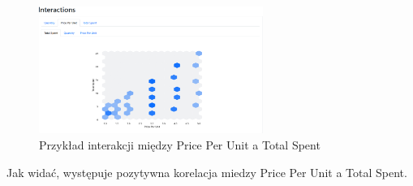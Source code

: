 \documentclass[a4paper,12pt]{article}
\begin{document}
\begin{figure}[H]
  \centering
  \includegraphics[width=0.65\textwidth]{images/py_interactions_example.png}
  \caption{Przykład interakcji między Price Per Unit a Total Spent}
\end{figure}

Jak widać, występuje pozytywna korelacja miedzy Price Per Unit a Total Spent.

\printbibliography
\end{document}
